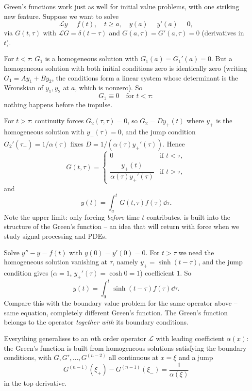 \documentclass[a4paper]{scrartcl}
\begin{document}
Green's functions work just as well for initial value problems, with one striking new feature. Suppose we want to solve
$$
\mathcal{L}y = f(t), \quad t \geq a, \quad y(a) = y'(a) = 0,
$$
via $G(t, \tau)$ with $\mathcal{L}G = \delta(t - \tau)$ and $G(a, \tau) = G'(a, \tau) = 0$ (derivatives in $t$).

For $t < \tau$: $G_1$ is a homogeneous solution with $G_1(a) = G_1'(a) = 0$. But a homogeneous solution with both initial conditions zero is identically zero (writing $G_1 = A y_1 + B y_2$, the conditions form a linear system whose determinant is the Wronskian of $y_1, y_2$ at $a$, which is nonzero). So
$$
G_1 \equiv 0 \quad \text{for } t < \tau:
$$
nothing happens before the impulse.

For $t > \tau$: continuity forces $G_2(\tau, \tau) = 0$, so $G_2 = D y_+(t)$ where $y_+$ is the homogeneous solution with $y_+(\tau) = 0$, and the jump condition $G_2'(\tau_+) = 1/\alpha(\tau)$ fixes $D = 1/(\alpha(\tau) y_+'(\tau))$. Hence
$$
G(t, \tau) = \begin{cases}
    0 &\mbox{if } t < \tau, \\[0.5ex]
    \dfrac{y_+(t)}{\alpha(\tau) y_+'(\tau)} &\mbox{if } t > \tau,
\end{cases}
$$
and
$$
y(t) = \int_a^t G(t, \tau) f(\tau) \dd \tau.
$$
Note the upper limit: only forcing \emph{before} time $t$ contributes.  is built into the structure of the Green's function -- an idea that will return with force when we study signal processing and PDEs.

\begin{example}
    Solve $y'' - y = f(t)$ with $y(0) = y'(0) = 0$.
    For $t > \tau$ we need the homogeneous solution vanishing at $\tau$, namely $y_+ = \sinh(t - \tau)$, and the jump condition gives ($\alpha = 1$, $y_+'(\tau) = \cosh 0 = 1$) coefficient $1$. So
    $$
    y(t) = \int_0^t \sinh(t - \tau) f(\tau) \dd \tau.
    $$
    Compare this with the boundary value problem for the same operator above -- same equation, completely different Green's function. The Green's function belongs to the operator \emph{together with} its boundary conditions.
\end{example}

\begin{remark}
    Everything generalises to an $n$th order operator $\mathcal{L}$ with leading coefficient $\alpha(x)$: the Green's function is built from homogeneous solutions satisfying the boundary conditions, with $G, G', \dots, G^{(n - 2)}$ all continuous at $x = \xi$ and a jump
    $$
    G^{(n-1)}(\xi_+) - G^{(n - 1)}(\xi_-) = \frac{1}{\alpha(\xi)}
    $$
    in the top derivative.
\end{remark}
\end{document}
